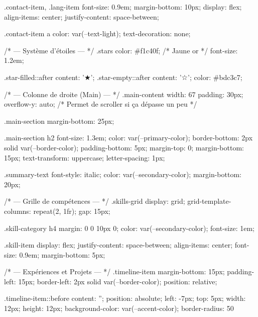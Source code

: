         .contact-item, .lang-item {
            font-size: 0.9em;
            margin-bottom: 10px;
            display: flex;
            align-items: center;
            justify-content: space-between;
        }
        
        .contact-item a { color: var(--text-light); text-decoration: none; }

        /* --- Système d'étoiles --- */
        .stars {
            color: #f1c40f; /* Jaune or */
            font-size: 1.2em;
        }
        
        .star-filled::after { content: '★'; }
        .star-empty::after { content: '☆'; color: #bdc3c7; }

        /* --- Colonne de droite (Main) --- */
        .main-content {
            width: 67%
            padding: 30px;
            overflow-y: auto; /* Permet de scroller si ça dépasse un peu */
        }

        .main-section {
            margin-bottom: 25px;
        }

        .main-section h2 {
            font-size: 1.3em;
            color: var(--primary-color);
            border-bottom: 2px solid var(--border-color);
            padding-bottom: 5px;
            margin-top: 0;
            margin-bottom: 15px;
            text-transform: uppercase;
            letter-spacing: 1px;
        }

        .summary-text {
            font-style: italic;
            color: var(--secondary-color);
            margin-bottom: 20px;
        }

        /* --- Grille de compétences --- */
        .skills-grid {
            display: grid;
            grid-template-columns: repeat(2, 1fr);
            gap: 15px;
        }

        .skill-category h4 {
            margin: 0 0 10px 0;
            color: var(--secondary-color);
            font-size: 1em;
        }

        .skill-item {
            display: flex;
            justify-content: space-between;
            align-items: center;
            font-size: 0.9em;
            margin-bottom: 5px;
        }

        /* --- Expériences et Projets --- */
        .timeline-item {
            margin-bottom: 15px;
            padding-left: 15px;
            border-left: 2px solid var(--border-color);
            position: relative;
        }
        
        .timeline-item::before {
            content: '';
            position: absolute;
            left: -7px;
            top: 5px;
            width: 12px;
            height: 12px;
            background-color: var(--accent-color);
            border-radius: 50%
        }

